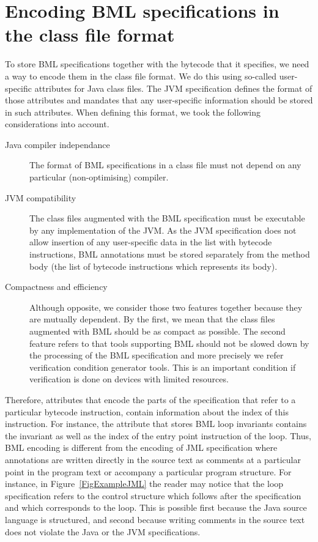 \section{Encoding BML specifications in the class file format}
\label{SecClassfile}

To store BML specifications together with the bytecode that it
specifies, we need a way to encode them in the class file format. We
do this using so-called user-specific attributes for Java class
files. The JVM specification defines the format of those attributes
and mandates that any user-specific information should be stored in
such attributes. When defining this format, we took the following
considerations into account.

\begin{description}
\item [Java compiler independance]
The format of BML specifications in a class file must not depend on
any particular (non-optimising) compiler.
    
      
\item [JVM compatibility]
The class files augmented with the BML specification must be
executable by any implementation of the JVM.  As the JVM specification
does not allow insertion of any user-specific data in the list with
bytecode instructions, BML annotations must be stored separately from
the method body (the list of bytecode instructions which represents
its body).

\item[Compactness and efficiency]
      Although opposite, we consider those two features together
      because they are mutually dependent. By the first, we mean that
      the class files augmented with BML should be as compact as
      possible.  The second feature refers to that tools supporting
      BML should not be slowed down by the processing of the BML
      specification and more precisely we refer verification condition
      generator tools.  This is an important condition if verification
      is done on devices with limited resources.

\end{description}	  

	    

Therefore, attributes that encode the parts of the specification that
refer to a particular bytecode instruction, contain information about
the index of this instruction. For instance, the attribute that stores
BML loop invariants contains the invariant as well as the index of the
entry point instruction of the loop.  Thus, BML encoding is different
from the encoding of JML specification where annotations are written
directly in the source text as comments at a particular point in the
program text or accompany a particular program structure. For
instance, in Figure~\ref{FigExampleJML} the reader may notice that the
loop specification refers to the control structure which follows after
the specification and which corresponds to the loop.  This is possible
first because the Java source language is structured, and second
because writing comments in the source text does not violate the Java
or the JVM specifications.
	  

